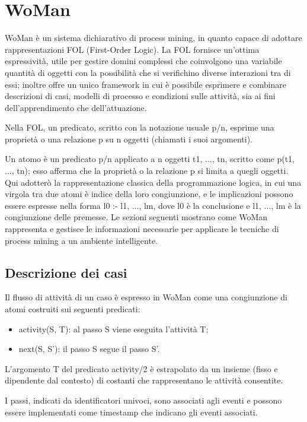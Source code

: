 \chapter{WoMan}
\cite{IncrLearnDailyRoutWorkflowSmartHomeEnvir} \cite{WoMan} WoMan è un sistema dichiarativo di process mining, in quanto capace di adottare rappresentazioni FOL (First-Order Logic). La FOL fornisce un'ottima espressività, utile per gestire domini complessi che coinvolgono una variabile quantità di oggetti con la possibilità che si verifichino diverse interazioni tra di essi; inoltre offre un unico framework in cui è possibile esprimere e combinare descrizioni di casi, modelli di processo e condizioni sulle attività, sia ai fini dell’apprendimento che dell’attuazione. 

Nella FOL, un predicato, scritto con la notazione usuale p/n, esprime una proprietà o una relazione p su n oggetti (chiamati i suoi argomenti). 

Un atomo è un predicato p/n applicato a n oggetti t1, ..., tn, scritto come p(t1, ..., tn); esso afferma che la proprietà o la relazione p si limita a quegli oggetti. Qui adotterò la rappresentazione classica della programmazione logica, in cui una virgola tra due atomi è indice della loro congiunzione, e le implicazioni possono essere espresse nella forma l0 :- l1, ..., lm, dove l0 è la conclusione e l1, ..., lm è la congiunzione delle premesse. Le sezioni seguenti mostrano come WoMan rappresenta e gestisce le informazioni necessarie per applicare le tecniche di process mining a un ambiente intelligente.

\section{Descrizione dei casi}
Il flusso di attività di un caso è espresso in WoMan come una congiunzione di atomi costruiti sui seguenti predicati:
\begin{itemize}
\item activity(S, T): al passo S viene eseguita l'attività T;
\item next(S, S'): il passo S segue il passo S'.
\end{itemize}

L'argomento T del predicato activity/2 è estrapolato da un insieme (fisso e dipendente dal contesto) di costanti che rappresentano le attività consentite. 

I passi, indicati da identificatori univoci, sono associati agli eventi e possono essere implementati come timestamp che indicano gli eventi associati. 

